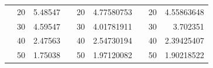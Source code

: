 \begin{table}[h]
\begin{tabular}{|ccrccrccr|}
\rowcolor[HTML]{DDFDFF} 
\multicolumn{1}{|c|}{\cellcolor[HTML]{FFFFC7}}                                & \multicolumn{1}{c|}{\cellcolor[HTML]{DDFDFF}20}        & \multicolumn{1}{r|}{\cellcolor[HTML]{DDFDFF}5.48547}    & \multicolumn{1}{c|}{\cellcolor[HTML]{FFFFC7}}                                & \multicolumn{1}{c|}{\cellcolor[HTML]{DDFDFF}20}        & \multicolumn{1}{r|}{\cellcolor[HTML]{DDFDFF}4.77580753} & \multicolumn{1}{c|}{\cellcolor[HTML]{FFFFC7}}                                & \multicolumn{1}{c|}{\cellcolor[HTML]{DDFDFF}20}        & 4.55863648                                              \\ \cline{2-3} \cline{5-6} \cline{8-9} 
\rowcolor[HTML]{DAE8FC} 
\multicolumn{1}{|c|}{\cellcolor[HTML]{FFFFC7}}                                & \multicolumn{1}{c|}{\cellcolor[HTML]{DAE8FC}30}        & \multicolumn{1}{r|}{\cellcolor[HTML]{DAE8FC}4.59547}    & \multicolumn{1}{c|}{\cellcolor[HTML]{FFFFC7}}                                & \multicolumn{1}{c|}{\cellcolor[HTML]{DAE8FC}30}        & \multicolumn{1}{r|}{\cellcolor[HTML]{DAE8FC}4.01781911} & \multicolumn{1}{c|}{\cellcolor[HTML]{FFFFC7}}                                & \multicolumn{1}{c|}{\cellcolor[HTML]{DAE8FC}30}        & 3.702351                                                \\ \cline{2-3} \cline{5-6} \cline{8-9} 
\rowcolor[HTML]{DDFDFF} 
\multicolumn{1}{|c|}{\cellcolor[HTML]{FFFFC7}}                                & \multicolumn{1}{c|}{\cellcolor[HTML]{DDFDFF}40}        & \multicolumn{1}{r|}{\cellcolor[HTML]{DDFDFF}2.47563}    & \multicolumn{1}{c|}{\cellcolor[HTML]{FFFFC7}}                                & \multicolumn{1}{c|}{\cellcolor[HTML]{DDFDFF}40}        & \multicolumn{1}{r|}{\cellcolor[HTML]{DDFDFF}2.54730194} & \multicolumn{1}{c|}{\cellcolor[HTML]{FFFFC7}}                                & \multicolumn{1}{c|}{\cellcolor[HTML]{DDFDFF}40}        & 2.39425407                                              \\ \cline{2-3} \cline{5-6} \cline{8-9} 
\rowcolor[HTML]{DAE8FC} 
\multicolumn{1}{|c|}{\cellcolor[HTML]{FFFFC7}}                                & \multicolumn{1}{c|}{\cellcolor[HTML]{DAE8FC}50}        & \multicolumn{1}{r|}{\cellcolor[HTML]{DAE8FC}1.75038}    & \multicolumn{1}{c|}{\cellcolor[HTML]{FFFFC7}}                                & \multicolumn{1}{c|}{\cellcolor[HTML]{DAE8FC}50}        & \multicolumn{1}{r|}{\cellcolor[HTML]{DAE8FC}1.97120082} & \multicolumn{1}{c|}{\cellcolor[HTML]{FFFFC7}}                                & \multicolumn{1}{c|}{\cellcolor[HTML]{DAE8FC}50}        & 1.90218522                                              \\ \cline{2-3} \cline{5-6} \cline{8-9} 

\end{tabular}
\end{table}
